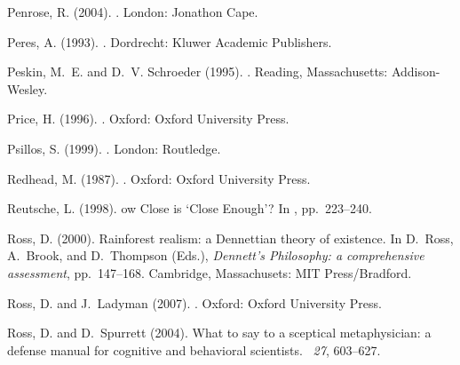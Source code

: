 \documentclass[12pt]{article}
\begin{document}
\begin{thebibliography}{}
Penrose, R. (2004).
.
\newblock London: Jonathon Cape.

Peres, A. (1993).
.
\newblock Dordrecht: Kluwer Academic Publishers.

Peskin, M.~E. and D.~V. Schroeder (1995).
.
\newblock Reading, Massachusetts: Addison-Wesley.

Price, H. (1996).
.
\newblock Oxford: Oxford University Press.

Psillos, S. (1999).
.
\newblock London: Routledge.

Redhead, M. (1987).
.
\newblock Oxford: Oxford University Press.

Reutsche, L. (1998).
ow {C}lose is `{C}lose {E}nough'?
\newblock In , pp.\  223--240.

Ross, D. (2000).
\newblock Rainforest realism: a {D}ennettian theory of existence.
\newblock In D.~Ross, A.~Brook, and D.~Thompson (Eds.), {\em {D}ennett's
  Philosophy: a comprehensive assessment}, pp.\  147--168. Cambridge,
  Massachusets: MIT Press/Bradford.

Ross, D. and J.~Ladyman (2007).
.
\newblock Oxford: Oxford University Press.

Ross, D. and D.~Spurrett (2004).
\newblock What to say to a sceptical metaphysician: a defense manual for
  cognitive and behavioral scientists.
~{\em 27}, 603--627.


\end{thebibliography}
\end{document}
